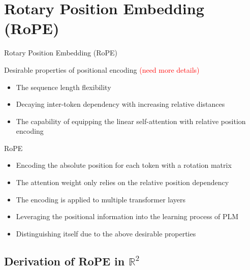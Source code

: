 \documentclass{beamer}
\begin{document}
	\section{Rotary Position Embedding (RoPE)}
	\begin{frame}{Rotary Position Embedding (RoPE)}	
		\begin{block}{Desirable properties of positional encoding \textcolor{red}{(need more details)}}
			\begin{itemize}				
				\item The sequence length flexibility
				\item Decaying inter-token dependency with increasing relative distances
				\item The capability of equipping the linear self-attention with relative position encoding
			\end{itemize}
		\end{block}		
		\begin{block}{RoPE}
			\begin{itemize}								
				\item Encoding the absolute position for each token with a rotation matrix
				\item The attention weight only relies on the relative position dependency
				\item The encoding is applied to multiple transformer layers
				\item Leveraging the positional information into the learning process of PLM
				\item Distinguishing itself due to the above desirable properties
			\end{itemize}
		\end{block}
	\end{frame}
	
	\subsection{Derivation of RoPE in $\mathbb{R}^2$}
	
\end{document}
